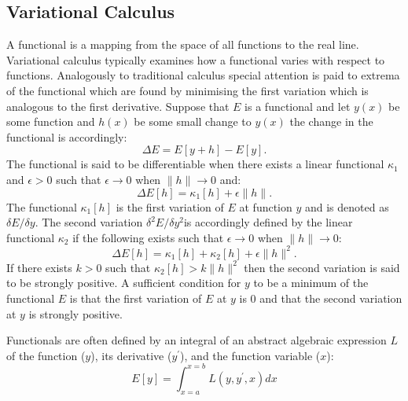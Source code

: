 \subsection{Variational Calculus}
A functional is a mapping from the space of all functions to the real line. Variational calculus typically examines how a functional varies with respect to functions. Analogously to traditional calculus special attention is paid to extrema of the functional which are found by minimising the first variation which is analogous to the first derivative. Suppose that $E$ is a functional and let $y(x)$ be some function and $h(x)$ be some small change to $y(x)$ the change in the functional is accordingly:
\begin{equation}
\Delta E = E[y + h] - E[y].
\end{equation}
The functional is said to be differentiable when there exists a linear functional $\kappa_1$ and $\epsilon >0$ such that $\epsilon \rightarrow 0$ when $\lVert h \rVert \rightarrow 0$ and:
\begin{equation}
\Delta E[h] = \kappa_1[h] + \epsilon  \lVert h \rVert.
\end{equation}
The functional $\kappa_1[h]$ is the first variation of $E$ at function $y$ and is denoted as $\delta E / \delta y$. The second variation  $\delta^2 E / \delta y^2$is accordingly defined by the linear functional $\kappa_2$ if the following exists such that $\epsilon \rightarrow 0$ when $\lVert h \rVert \rightarrow 0$:
\begin{equation}
\Delta E[h] = \kappa_1[h] + \kappa_2[h] + \epsilon  \lVert h \rVert^2.
\end{equation}
If there exists $k>0$ such that $\kappa_2[h] > k  \lVert h \rVert^2$ then the second variation is said to be strongly positive. A sufficient condition for $y$ to be a minimum of the functional $E$ is that the first variation of $E$ at $y$ is 0 and that the second variation at $y$ is strongly positive. 

Functionals are often defined by an integral of an abstract algebraic expression $L$ of the function ($y$), its derivative ($y^\prime$), and the function variable ($x$):
\begin{equation}
E[y] = \int_{x=a}^{x=b} L(y, y^\prime, x)dx
\end{equation}

